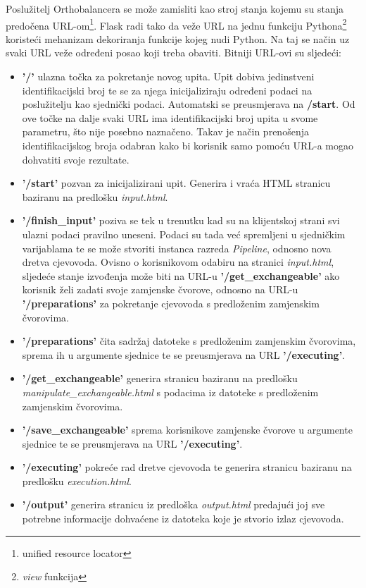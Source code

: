 Poslužitelj Orthobalancera se može zamisliti kao stroj stanja kojemu su stanja
predočena URL-om\footnote{unified resource locator}. Flask radi tako da veže
URL na jednu funkciju Pythona\footnote{\emph{view} funkcija} koristeći
mehanizam dekoriranja \cite{pep318} funkcije kojeg nudi Python. Na taj se način uz
svaki URL veže određeni posao koji treba obaviti. Bitniji URL-ovi su sljedeći:

\begin{itemize}

    \item \textbf{'/'} ulazna točka za pokretanje novog upita. Upit dobiva
jedinstveni identifikacijski broj te se za njega inicijaliziraju određeni podaci
na poslužitelju kao sjednički podaci. Automatski se preusmjerava na
\textbf{/start}. Od ove točke na dalje svaki URL ima identifikacijski broj upita
u svome parametru, što nije posebno naznačeno. Takav je način prenošenja
identifikacijskog broja odabran kako bi korisnik samo pomoću URL-a mogao
dohvatiti svoje rezultate.

    \item \textbf{'/start'} pozvan za inicijalizirani upit. Generira i vraća
HTML stranicu baziranu na predlošku \emph{input.html}.

    \item \textbf{'/finish\_input'} poziva se tek u trenutku kad su na klijentskoj
strani svi ulazni podaci pravilno uneseni. Podaci su tada već spremljeni u
sjedničkim varijablama te se može stvoriti instanca razreda \emph{Pipeline},
odnosno nova dretva cjevovoda. Ovisno o korisnikovom odabiru na stranici
\emph{input.html}, sljedeće stanje izvođenja može biti na URL-u
\textbf{'/get\_exchangeable'} ako korisnik želi zadati svoje zamjenske čvorove,
odnosno na URL-u \textbf{'/preparations'} za pokretanje cjevovoda s predloženim
zamjenskim čvorovima.

    \item \textbf{'/preparations'} čita sadržaj datoteke s predloženim
zamjenskim čvorovima, sprema ih u argumente sjednice te se preusmjerava na URL
\textbf{'/executing'}.

    \item \textbf{'/get\_exchangeable'} generira stranicu baziranu na predlošku
\emph{manipulate\_exchangeable.html} s podacima  iz datoteke s predloženim
zamjenskim čvorovima.

    \item \textbf{'/save\_exchangeable'} sprema korisnikove zamjenske čvorove u
argumente sjednice te se preusmjerava na URL \textbf{'/executing'}.

    \item \textbf{'/executing'} pokreće rad dretve cjevovoda te generira
stranicu baziranu na predlošku \emph{execution.html}.

    \item \textbf{'/output'} generira stranicu iz predloška \emph{output.html}
predajući joj sve potrebne informacije dohvaćene iz datoteka koje je stvorio
izlaz cjevovoda.

\end{itemize}

